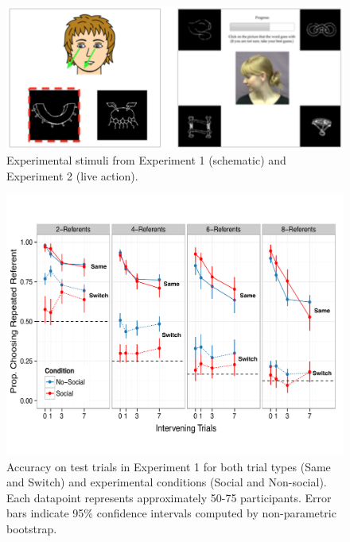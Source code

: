 \documentclass[10pt,letterpaper]{article}
\begin{document}
\begin{figure} [t!]
\begin{center}
\includegraphics[scale=0.4]{plots_figs/soc-xsit-stimuli.png}
\end{center}
\caption{Experimental stimuli from Experiment 1 (schematic) and Experiment 2 (live action).}
\end{figure}

\begin{figure}[t!]
\begin{center}
\includegraphics[scale=0.5]{plots_figs/acc-test-expt1}
\end{center}
\caption{Accuracy on test trials in Experiment 1 for both trial types (Same and Switch) and 
experimental conditions (Social and Non-social). Each datapoint represents 
approximately 50-75 participants. Error bars indicate 95\% confidence intervals 
computed by non-parametric bootstrap.}
\end{figure}
\end{document}
